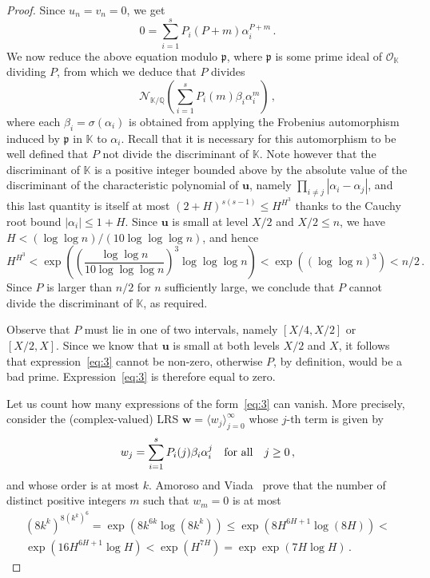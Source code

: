 \documentclass[preprint,12pt]{elsarticle}
\begin{document}
\begin{proof}
Since $u_n= v_n = 0$, we get
\[
0=\sum_{i=1}^s P_i(P+m)\alpha_i^{P+m} \, .
\]
We now reduce the above equation modulo $\mathfrak{p}$, where
$\mathfrak{p}$ is some prime ideal of ${\mathcal O}_{\mathbb K}$
dividing $P$, from which we deduce that $P$ divides
\begin{equation}
\label{eq:3}
{\mathcal N}_{{\mathbb K}/{\mathbb Q}}\left(\sum_{i=1}^s
  P_i(m)\beta_i\alpha_i^m\right) \, ,
\end{equation}
where each $\beta_i=\sigma(\alpha_i)$ is obtained from applying the
Frobenius automorphism induced by $\mathfrak{p}$ in ${\mathbb K}$ to
$\alpha_i$. Recall that it is necessary for this automorphism to be
well defined that $P$ not divide the discriminant of ${\mathbb K}$.
Note however that the discriminant  of $\mathbb K$ is a positive integer
bounded above by the absolute value of the discriminant of the
characteristic polynomial of $\mathbf{u}$, namely
$\prod_{ i \neq j} |\alpha_i-\alpha_j|$, and this last quantity is
itself at most $(2+H)^{s(s-1)} \leq H^{H^3}$ thanks to the Cauchy root
bound $|\alpha_i| \leq 1+H$. Since $\mathbf{u}$ is small at level
$X/2$ and $X/2 \leq n$, we have $H < (\log \log n) / (10 \log \log \log
n)$, and hence
\[
H^{H^3} < \exp\left(\left(\frac{\log\log n}{10\log\log\log n}\right)^3 \log\log\log n\right)<\exp((\log\log
n)^3)<n/2 \, . \]
Since $P$ is larger than $n/2$ for $n$ sufficiently large, we conclude
that $P$ cannot divide the discriminant  of $\mathbb K$, as required.

Observe that $P$ must lie in one of two intervals,
namely $[X/4,X/2]$ or $[X/2,X]$. Since we know that $\mathbf{u}$ is
small at both levels $X/2$ and $X$, it follows that
expression~\eqref{eq:3} cannot be non-zero, otherwise $P$, by definition,
would be a bad prime. Expression~\eqref{eq:3} is therefore equal to zero.

Let us count how many expressions of the form~\eqref{eq:3} can
vanish. More precisely, consider the (complex-valued) LRS
$\mathbf{w} = \langle w_j \rangle_{j=0}^{\infty}$ whose $j$-th term is
given by
\[
w_j=\sum_{i=1}^s P_i(j)\beta_i\alpha_i^j\quad {\text{\rm
    for~all}}\quad j\ge 0 \, ,
\]
and whose order is at most $k$. Amoroso and Viada~\cite{AV11}
prove that the number of distinct positive integers $m$ such that $w_m = 0$
is at most
\begin{multline*}
(8k^k)^{8(k^k)^6} =  \exp(8k^{6k}\log (8k^k))\le
\exp(8H^{6H+1}\log(8H)) 
 < \\ \exp(16 H^{6H+1}\log H)<\exp(H^{7H})=\exp \exp (7H\log H) \, .
\end{multline*}


\end{proof}
\end{document}

